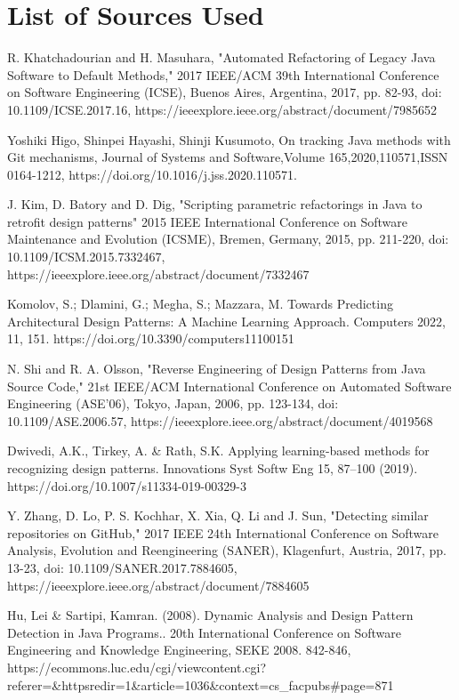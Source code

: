 \documentclass[draft]{article}
\begin{document}
\newpage
\section*{List of Sources Used}
\begin{thebibliography}{9}
  R. Khatchadourian and H. Masuhara, "{}Automated Refactoring of Legacy Java Software to Default Methods,"{} 2017 IEEE/ACM 39th International Conference on Software Engineering (ICSE), Buenos Aires, Argentina, 2017, pp. 82-93, doi: 10.1109/ICSE.2017.16, https://ieeexplore.ieee.org/abstract/document/7985652

  Yoshiki Higo, Shinpei Hayashi, Shinji Kusumoto, On tracking Java methods with Git mechanisms, Journal of Systems and Software,Volume 165,2020,110571,ISSN 0164-1212, https://doi.org/10.1016/j.jss.2020.110571.

  J. Kim, D. Batory and D. Dig, "{}Scripting parametric refactorings in Java to retrofit design patterns"{} 2015 IEEE International Conference on Software Maintenance and Evolution (ICSME), Bremen, Germany, 2015, pp. 211-220, doi: 10.1109/ICSM.2015.7332467, https://ieeexplore.ieee.org/abstract/document/7332467

  Komolov, S.; Dlamini, G.; Megha, S.; Mazzara, M. Towards Predicting Architectural Design Patterns: A Machine Learning Approach. Computers 2022, 11, 151. https://doi.org/10.3390/computers11100151

  N. Shi and R. A. Olsson, "{}Reverse Engineering of Design Patterns from Java Source Code,"{} 21st IEEE/ACM International Conference on Automated Software Engineering (ASE'06), Tokyo, Japan, 2006, pp. 123-134, doi: 10.1109/ASE.2006.57, https://ieeexplore.ieee.org/abstract/document/4019568

  Dwivedi, A.K., Tirkey, A. \& Rath, S.K. Applying learning-based methods for recognizing design patterns. Innovations Syst Softw Eng 15, 87–100 (2019). https://doi.org/10.1007/s11334-019-00329-3

  Y. Zhang, D. Lo, P. S. Kochhar, X. Xia, Q. Li and J. Sun, "{}Detecting similar repositories on GitHub,"{} 2017 IEEE 24th International Conference on Software Analysis, Evolution and Reengineering (SANER), Klagenfurt, Austria, 2017, pp. 13-23, doi: 10.1109/SANER.2017.7884605, https://ieeexplore.ieee.org/abstract/document/7884605

  Hu, Lei \& Sartipi, Kamran. (2008). Dynamic Analysis and Design Pattern Detection in Java Programs.. 20th International Conference on Software Engineering and Knowledge Engineering, SEKE 2008. 842-846, https://ecommons.luc.edu/cgi/viewcontent.cgi?referer=\&httpsredir=1\&article=1036\&context=cs\_facpubs\#page=871

\end{thebibliography}
\end{document}
